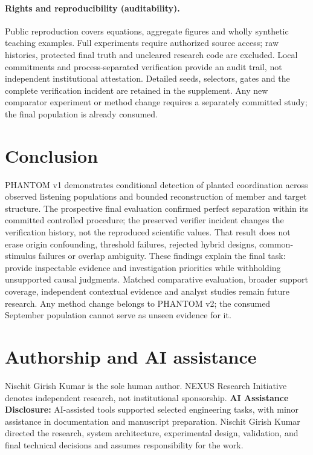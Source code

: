 \documentclass[11pt,letterpaper]{article}
\begin{document}
\paragraph{Rights and reproducibility (auditability).} Public reproduction covers equations, aggregate figures and wholly synthetic teaching examples. Full experiments require authorized source access; raw histories, protected final truth and uncleared research code are excluded. Local commitments and process-separated verification provide an audit trail, not independent institutional attestation. Detailed seeds, selectors, gates and the complete verification incident are retained in the supplement. Any new comparator experiment or method change requires a separately committed study; the final population is already consumed.

\section{Conclusion}
PHANTOM v1 demonstrates conditional detection of planted coordination across observed listening populations and bounded reconstruction of member and target structure. The prospective final evaluation confirmed perfect separation within its committed controlled procedure; the preserved verifier incident changes the verification history, not the reproduced scientific values. That result does not erase origin confounding, threshold failures, rejected hybrid designs, common-stimulus failures or overlap ambiguity. These findings explain the final task: provide inspectable evidence and investigation priorities while withholding unsupported causal judgments. Matched comparative evaluation, broader support coverage, independent contextual evidence and analyst studies remain future research. Any method change belongs to PHANTOM v2; the consumed September population cannot serve as unseen evidence for it.

\section*{Authorship and AI assistance}
Nischit Girish Kumar is the sole human author. NEXUS Research Initiative denotes independent research, not institutional sponsorship. \textbf{AI Assistance Disclosure:} AI-assisted tools supported selected engineering tasks, with minor assistance in documentation and manuscript preparation. Nischit Girish Kumar directed the research, system architecture, experimental design, validation, and final technical decisions and assumes responsibility for the work.
\begingroup\small\setlength{\bibsep}{5pt}\endgroup
\end{document}
